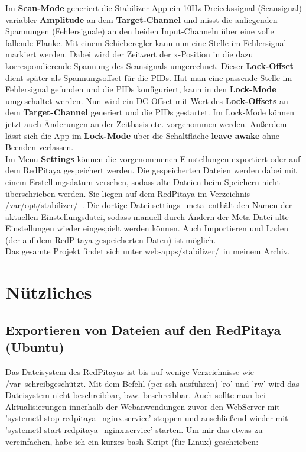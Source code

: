 \documentclass[11pt]{scrartcl}
\begin{document}
Im \textbf{Scan-Mode} generiert die Stabilizer App ein 10Hz Dreieckssignal (Scansignal) variabler \textbf{Amplitude} an dem \textbf{Target-Channel} und misst die anliegenden Spannungen (Fehlersignale) an den beiden Input-Channeln über eine volle fallende Flanke. Mit einem Schieberegler kann nun eine Stelle im Fehlersignal markiert werden. Dabei wird der Zeitwert der x-Position in die dazu korrespondierende Spannung des Scansignals umgerechnet. Dieser \textbf{Lock-Offset} dient später als Spannungsoffset für die PIDs. Hat man eine passende Stelle im Fehlersignal gefunden und die PIDs konfiguriert, kann in den \textbf{Lock-Mode} umgeschaltet werden. Nun wird ein DC Offset mit Wert des \textbf{Lock-Offsets} an dem \textbf{Target-Channel} generiert und die PIDs gestartet. Im Lock-Mode können jetzt auch Änderungen an der Zeitbasis etc. vorgenommen werden. Außerdem lässt sich die App im \textbf{Lock-Mode} über die Schaltfläche \textbf{leave awake} ohne Beenden verlassen.\\
Im Menu \textbf{Settings} können die vorgenommenen Einstellungen exportiert oder auf dem RedPitaya gespeichert werden. Die gespeicherten Dateien werden dabei mit einem Erstellungsdatum versehen, sodass alte Dateien beim Speichern nicht überschrieben werden. Sie liegen auf dem RedPitaya im Verzeichnis \grqq /var/opt/stabilizer/\grqq~. Die dortige Datei \grqq settings\_meta\grqq~enthält den Namen der aktuellen Einstellungsdatei, sodass manuell durch Ändern der Meta-Datei alte Einstellungen wieder eingespielt werden können. Auch Importieren und Laden (der auf dem RedPitaya gespeicherten Daten) ist möglich.\\

Das gesamte Projekt findet sich unter \grqq web-apps/stabilizer/\grqq~in meinem Archiv.


\section{Nützliches}

\subsection{Exportieren von Dateien auf den RedPitaya (Ubuntu)}
Das Dateisystem des RedPitayas ist bis auf wenige Verzeichnisse wie \grqq /var\grqq~schreibgeschützt. Mit dem Befehl (per ssh ausführen) 'ro' und 'rw' wird das Dateisystem nicht-beschreibbar, bzw. beschreibbar. Auch sollte man bei Aktualisierungen innerhalb der Webanwendungen zuvor den WebServer mit 'systemctl stop redpitaya\_nginx.service' stoppen und anschließend wieder mit 'systemctl start redpitaya\_nginx.service' starten. Um mir das etwas zu vereinfachen, habe ich ein kurzes bash-Skript (für Linux) geschrieben:
\end{document}

